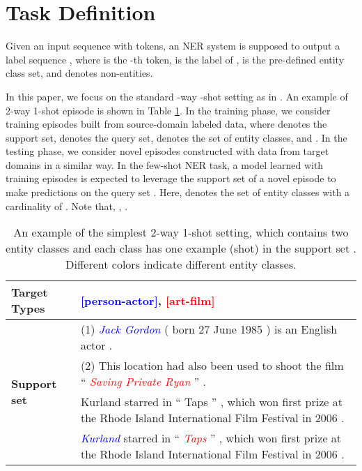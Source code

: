 \documentclass[11pt]{article}
\begin{document}
\section{Task Definition}
Given an input sequence  with  tokens, an NER system is supposed to output a label sequence , where  is the -th token,  is the label of ,  is the pre-defined entity class set, and  denotes non-entities.

In this paper, we focus on the standard -way -shot setting
as in \citet{ding2021nerd}. An example of 2-way 1-shot episode is shown in Table \ref{tab:taskexample}.
In the training phase, we consider training episodes  built from source-domain labeled data, where  denotes the support set,  denotes the query set,  denotes the set of entity classes, and .
In the testing phase, we consider novel episodes  constructed with data from target domains in a similar way.
In the few-shot NER task, a model learned with training episodes  is expected to leverage the support set   of a novel episode  to make predictions on the query set .
Here,  denotes the set of entity classes
with a cardinality of .
Note that, , .


\begin{table}[htbp]
    \centering
    \small
    \begin{tabular}{l|p{4.45cm}}
    \toprule
    \textbf{Target Types}  & \textcolor{blue}{[person-actor]}, \textcolor{red}{[art-film]} \\
    \midrule
    \multirow{5}{*}{\textbf{Support set} } &
    (1) \emph{\textcolor{blue}{Jack Gordon}} ( born 27 June 1985 ) is an English actor .\\
     & (2) This location had also been used to shoot the film `` \emph{\textcolor{red}{Saving Private Ryan}} '' . \\
    \midrule
    \midrule
    \multirow{3}{*}{\textbf{Query Set} } &
    Kurland starred in `` Taps '' , which won first prize at the Rhode Island International Film Festival in 2006 . \\
    \midrule
    \multirow{4}{*}{\textbf{Expected output}} & 
    \emph{\textcolor{blue}{Kurland}} starred in `` \emph{\textcolor{red}{Taps}} '' , which won first prize at the Rhode Island International Film Festival in 2006 . \\
    \bottomrule
    \end{tabular}
    \caption{An example of the simplest 2-way 1-shot setting, which contains two entity classes and each class has one example (shot) in the support set . Different colors indicate different entity classes.}
\label{tab:taskexample}
\end{table}
\end{document}
